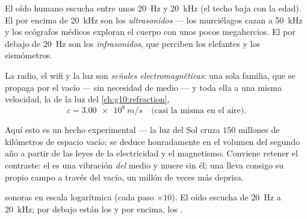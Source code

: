 \begin{definition}\label{def:g10:signals-and-waves:ultrasound}
El oído humano escucha  entre unos \qty{20}{Hz} y \qty{20}{kHz}
(el techo baja con la edad). El  por encima de \qty{20}{kHz} son
los \emph{ultrasonidos} --- los murciélagos cazan a
\qty{50}{kHz} y los ecógrafos médicos exploran el cuerpo con unos pocos
megahercios. El  por debajo de \qty{20}{Hz} son los
\emph{infrasonidos}, que perciben los elefantes y
los sismómetros.
\end{definition}

\begin{proposition}\label{prop:g10:signals-and-waves:em}
La radio, el wifi y la luz son \emph{señales
electromagnéticas}: una sola familia, que
se propaga por el vacío --- sin necesidad de medio --- y toda ella a una
misma velocidad, la de la luz del \cref{ch:g10:refraction},
\[
c = \qty{3.00e8}{m/s} \quad \text{(casi la misma en el aire).}
\]
\end{proposition}
\admitted

\begin{remark}\label{rem:g10:signals-and-waves:honest}
Aquí esto es un hecho experimental --- la luz del Sol cruza $150$
millones de kilómetros de espacio vacío; se deduce honradamente en el
volumen del segundo año a partir de las leyes de la electricidad y el
magnetismo. Conviene retener el contraste: el  es una vibración
\emph{del} medio y muere sin él; una  lleva
consigo su propio campo a través del vacío, un millón de veces más
deprisa.
\end{remark}

\begin{omfigure}

{\small {} sonoras en escala logarítmica (cada paso
$\times 10$). El oído escucha de \qty{20}{Hz} a \qty{20}{kHz}; por
debajo están los  y por encima, los .}
\end{omfigure}

